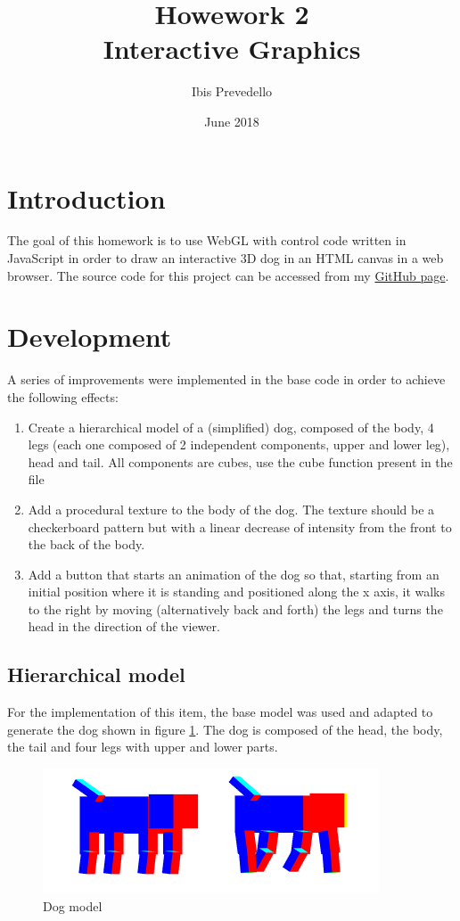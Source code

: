 \documentclass{article}
\title{%
Howework 2 \\
\large Interactive Graphics}
\date{June 2018}
\author{Ibis Prevedello}
\begin{document}
\maketitle

\section{Introduction}
The goal of this homework is to use WebGL with control code written in JavaScript in order to draw an interactive 3D dog in an HTML canvas in a web browser. The source code for this project can be accessed from my \href{https://github.com/ibiscp/Computer-Graphics-WebGL/tree/master/Homework2}{GitHub page}.

\section{Development}
A series of improvements were implemented in the base code in order to achieve the following effects:

\begin{enumerate}
\item Create a hierarchical model of a (simplified) dog, composed of the body, 4 legs (each one composed of 2 independent components, upper and lower leg), head and tail. All components are cubes, use the cube function present in the file
\item Add a procedural texture to the body of the dog. The texture should be a checkerboard pattern but with a linear decrease of intensity from the front to the back of the body.
\item Add a button that starts an animation of the dog so that, starting from an initial position where it is standing and positioned along the x axis, it walks to the right by moving (alternatively back and forth) the legs and turns the head in the direction of the viewer.
\end{enumerate}

\subsection {Hierarchical model}
For the implementation of this item, the base model was used and adapted to generate the dog shown in figure \ref{fig:fig1}. The dog is composed of the head, the body, the tail and four legs with upper and lower parts.

\begin{figure}[!ht]
\centering
\includegraphics[scale=1]{dog}
\caption{Dog model}
\label{fig:fig1}
\end{figure}
\end{document}
